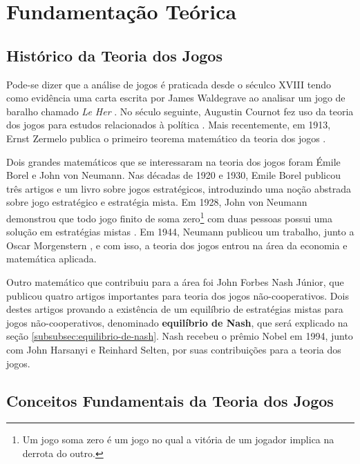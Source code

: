 \chapter[Fundamentação Teórica]{Fundamentação Teórica}
\label{cha:fundamentacao-teorica}

\section{Histórico da Teoria dos Jogos}
\label{sec:historico-da-teoria-dos-jogos}

Pode-se dizer que a análise de jogos é praticada desde o séculco XVIII tendo
como evidência uma carta escrita por James Waldegrave ao analisar um jogo de
baralho chamado \emph{Le Her} \cite{Prague_severalmilestones}. No século
seguinte, Augustin Cournot fez uso da teoria dos jogos para estudos relacionados
à política \cite{cournot_1838}. Mais recentemente, em 1913, Ernst Zermelo
publica o primeiro teorema matemático da teoria dos jogos \cite{zermelo_1913}.

Dois grandes matemáticos que se interessaram na teoria dos jogos foram Émile
Borel e John von Neumann. Nas décadas de 1920 e 1930, Emile Borel publicou três
artigos \cite{borel_1921} \cite{borel_1924} \cite{borel_1927} e um livro
\cite{borel_1938} sobre jogos estratégicos, introduzindo uma noção abstrada
sobre jogo estratégico e estratégia mista. Em 1928, John von Neumann demonstrou
que todo jogo finito de soma zero\footnote{Um jogo soma zero é um jogo no qual a
vitória de um jogador implica na derrota do outro.} com duas pessoas possui uma
solução em estratégias mistas \cite{neumann_1928}. Em 1944, Neumann publicou um
trabalho, junto a Oscar Morgenstern \cite{neumann_1944}, e com isso, a teoria
dos jogos entrou na área da economia e matemática aplicada.

Outro matemático que contribuiu para a área foi John Forbes Nash Júnior, que
publicou quatro artigos importantes para teoria dos jogos não-cooperativos. Dois
destes artigos \cite{nash_1950} \cite{nash_1951} provando a existência de um
equilíbrio de estratégias mistas para jogos não-cooperativos, denominado
\textbf{equilíbrio de Nash}, que será explicado na seção
\ref{subsubsec:equilibrio-de-nash}. Nash recebeu o prêmio Nobel em 1994, junto
com John Harsanyi e Reinhard Selten, por suas contribuições para a teoria dos
jogos.

\section{Conceitos Fundamentais da Teoria dos Jogos}
\label{sec:conceitos-fundamentais-da-teoria-dos-jogos}

